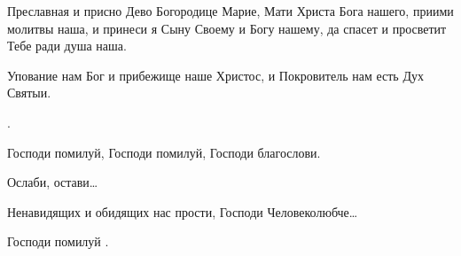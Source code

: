 \begin{mymulticols}
Преславная и присно Дево Богородице Марие, Мати Христа Бога нашего, приими молитвы наша, и принеси я Сыну Своему и Богу нашему, да спасет и просветит Тебе ради душа наша.

Упование нам Бог и прибежище наше Христос, и Покровитель нам есть Дух Святыи.

. 

Господи помилуй, Господи помилуй, Господи благослови.




 Ослаби, остави…

 Ненавидящих и обидящих нас прости, Господи Человеколюбче…

Господи помилуй . 



\end{mymulticols}

